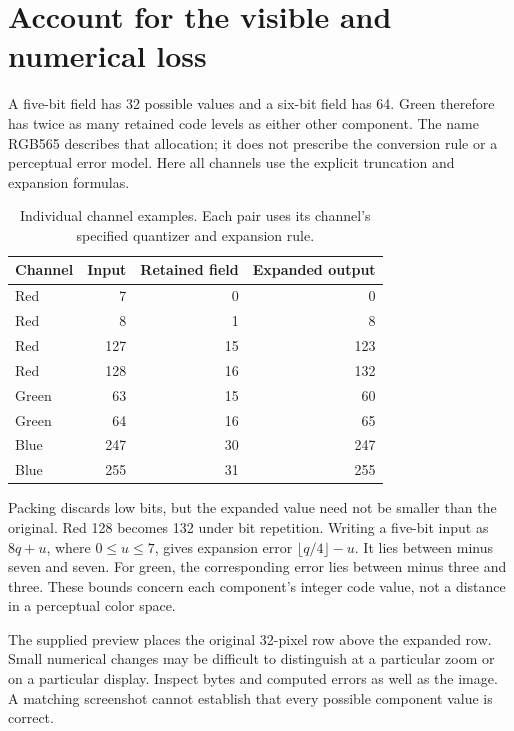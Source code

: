 \section{Account for the visible and numerical loss}\label{rgb-loss}
A five-bit field has 32 possible values and a six-bit field has 64. Green therefore
has twice as many retained code levels as either other component. The name RGB565
describes that allocation; it does not prescribe the conversion rule or a perceptual
error model. Here all channels use the explicit truncation and expansion formulas.

\begin{table}[htbp]
  \centering
  \caption{Individual channel examples. Each pair uses its channel's specified quantizer and expansion rule.}
  \begin{tabular}{lrrr}
    \toprule
    Channel & Input & Retained field & Expanded output \\
    \midrule
    Red     & 7     & 0              & 0               \\
    Red     & 8     & 1              & 8               \\
    Red     & 127   & 15             & 123             \\
    Red     & 128   & 16             & 132             \\
    Green   & 63    & 15             & 60              \\
    Green   & 64    & 16             & 65              \\
    Blue    & 247   & 30             & 247             \\
    Blue    & 255   & 31             & 255             \\
    \bottomrule
  \end{tabular}
\end{table}

Packing discards low bits, but the expanded value need not be smaller than the
original. Red 128 becomes 132 under bit repetition. Writing a five-bit input as
$8q+u$, where $0\leq u\leq7$, gives expansion error
$\lfloor q/4\rfloor-u$. It lies between minus seven and seven. For green, the
corresponding error lies between minus three and three. These bounds concern each
component's integer code value, not a distance in a perceptual color space.

The supplied preview places the original 32-pixel row above the expanded row.
Small numerical changes may be difficult to distinguish at a particular zoom or
on a particular display. Inspect bytes and computed errors as well as the image.
A matching screenshot cannot establish that every possible component value is correct.
